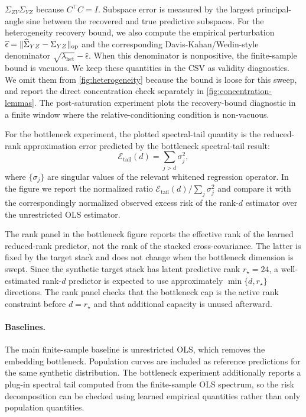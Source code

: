 $\Sigma_{ZY}\Sigma_{YZ}$ because $C^\top C=I$. Subspace error is measured by
the largest principal-angle sine between the recovered and true predictive
subspaces.
For the heterogeneity recovery bound, we also compute the empirical
perturbation $\widehat{\epsilon}=\|\widehat{\Sigma}_{YZ}-\Sigma_{YZ}\|_{\rm op}$
and the corresponding Davis-Kahan/Wedin-style denominator
$\sqrt{\lambda_{\mathrm{het}}}-\widehat{\epsilon}$. When this denominator is
nonpositive, the finite-sample bound is vacuous. We keep these quantities in
the CSV as validity diagnostics. {\color{blue}We omit them from \cref{fig:heterogeneity}
because the bound is loose for this sweep, and report the direct concentration
check separately in \cref{fig:concentration-lemmas}.} The post-saturation
experiment plots the recovery-bound diagnostic in a finite window where the
relative-conditioning condition is non-vacuous.

For the bottleneck experiment, the plotted spectral-tail quantity is the
reduced-rank approximation error predicted by the bottleneck spectral-tail
result:
\[
    \mathcal{E}_{\mathrm{tail}}(d)
    =
    \sum_{j>d} \sigma_j^2,
\]
where $\{\sigma_j\}$ are singular values of the relevant whitened regression
operator. In the figure we report the normalized ratio
$\mathcal{E}_{\mathrm{tail}}(d)/\sum_j\sigma_j^2$ and compare it with the
correspondingly normalized observed excess risk of the rank-$d$ estimator over
the unrestricted OLS estimator.

The rank panel in the bottleneck figure reports the effective rank of the
learned reduced-rank predictor, not the rank of the stacked cross-covariance.
The latter is fixed by the target stack and does not change when the bottleneck
dimension is swept. Since the synthetic target stack has latent
predictive rank $r_\star=24$, a well-estimated rank-$d$ predictor is expected to
use approximately $\min\{d,r_\star\}$ directions. The rank panel checks that the
bottleneck cap is the active rank constraint before $d=r_\star$ and that
additional capacity is unused afterward.


\paragraph{Baselines.}
The main finite-sample baseline is unrestricted OLS, which removes the
embedding bottleneck. Population curves are included as reference predictions
for the same synthetic distribution. The bottleneck experiment additionally
reports a plug-in spectral tail computed from the finite-sample OLS spectrum,
so the risk decomposition can be checked using learned empirical quantities
rather than only population quantities.


